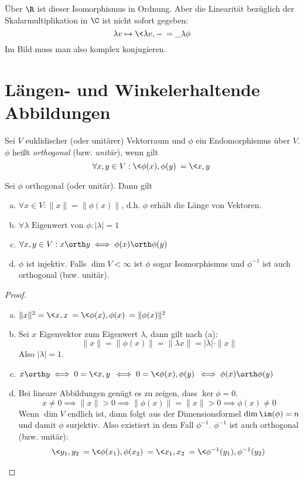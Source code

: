 \documentclass{mycourse}
\begin{document}
\begin{note}
	Über $\R$ ist dieser Isomorphismus in Ordnung.
	Aber die Linearität bezüglich der Skalarmultiplikation in $\C$ ist nicht sofort gegeben:
	\[
		\lambda v \mapsto \<\lambda v, -\> = \_{\lambda}\phi
	\]
	Im Bild muss man also komplex konjugieren.
\end{note}


\section{Längen- und Winkelerhaltende Abbildungen}


\begin{df}
	\label{df:13.15}
	Sei $V$ euklidischer (oder unitärer) Vektorraum und $\phi$ ein Endomorphismus über $V$.
	$\phi$ heißt \emph{orthogonal} (bzw. \emph{unitär}), wenn gilt
	\[
		\forall x,y\in V : \<\phi(x), \phi(y)\> = \<x,y\>
	\]
\end{df}

\begin{lem}
	\label{lem:13.16}
	Sei $\phi$ orthogonal (oder unitär).
	Dann gilt
	\begin{enumerate}[(a)]
		\item
			$\forall x\in V: \|x\| = \|\phi(x)\|$, d.h. $\phi$ erhält die Länge von Vektoren.
		\item
			$\forall \lambda \text{ Eigenwert von }\phi : |\lambda| = 1$
		\item
			$\forall x,y\in V:x\orth y \iff \phi(x) \orth \phi(y)$
		\item
			$\phi$ ist injektiv.
			Falls $\dim V<\infty$ ist $\phi$ sogar Isomorphismus und $\phi^{-1}$ ist auch orthogonal (bzw. unitär).
	\end{enumerate}
	\begin{proof}
		\begin{enumerate}[(a)]
			\item
				$\|x\|^2 = \<x,x\> = \<\phi(x),\phi(x)\> = \|\phi(x)\|^2$
			\item
				Sei $x$ Eigenvektor zum Eigenwert $\lambda$, dann gilt nach (a):
				\[
					\|x\| = \|\phi(x)\| = \|\lambda x\| = |\lambda|\cdot \|x\|
				\]
				Also $|\lambda| = 1$.
			\item
				$x\orth y \iff 0=\<x,y\> \iff 0=\<\phi(x),\phi(y)\> \iff \phi(x) \orth \phi(y)$
			\item
				Bei lineare Abbildungen genügt es zu zeigen, dass $\ker\phi = 0$.
				\[
					x\neq 0 \implies \|x\| > 0 \implies \|\phi(x)\| = \|x\| > 0 \implies \phi(x) \neq 0
				\]
				Wenn $\dim V$ endlich ist, dann folgt aus der Dimensionsformel $\dim \im(\phi) = n$ und damit $\phi$ surjektiv.
				Also existiert in dem Fall $\phi^{-1}$.
				$\phi^{-1}$ ist auch orthogonal (bzw. unitär):
				\begin{align*}
					\<y_1,y_2\> = \<\phi(x_1),\phi(x_2)\> = \<x_1,x_2\> = \<\phi^{-1}(y_1),\phi^{-1}(y_2)\>
				\end{align*}
		\end{enumerate}
	\end{proof}
\end{lem}
\end{document}
